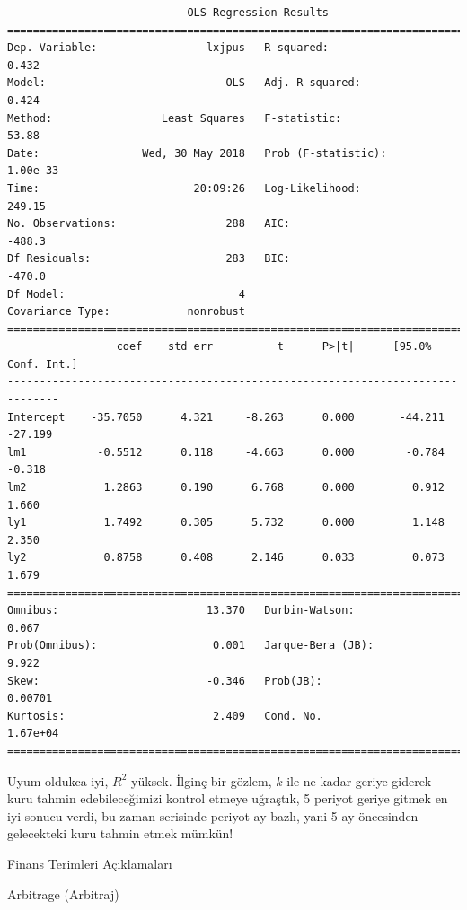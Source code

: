 \documentclass[12pt,fleqn]{article}\usepackage{../../common}
\begin{document}
\begin{verbatim}
                            OLS Regression Results                            
==============================================================================
Dep. Variable:                 lxjpus   R-squared:                       0.432
Model:                            OLS   Adj. R-squared:                  0.424
Method:                 Least Squares   F-statistic:                     53.88
Date:                Wed, 30 May 2018   Prob (F-statistic):           1.00e-33
Time:                        20:09:26   Log-Likelihood:                 249.15
No. Observations:                 288   AIC:                            -488.3
Df Residuals:                     283   BIC:                            -470.0
Df Model:                           4                                         
Covariance Type:            nonrobust                                         
==============================================================================
                 coef    std err          t      P>|t|      [95.0% Conf. Int.]
------------------------------------------------------------------------------
Intercept    -35.7050      4.321     -8.263      0.000       -44.211   -27.199
lm1           -0.5512      0.118     -4.663      0.000        -0.784    -0.318
lm2            1.2863      0.190      6.768      0.000         0.912     1.660
ly1            1.7492      0.305      5.732      0.000         1.148     2.350
ly2            0.8758      0.408      2.146      0.033         0.073     1.679
==============================================================================
Omnibus:                       13.370   Durbin-Watson:                   0.067
Prob(Omnibus):                  0.001   Jarque-Bera (JB):                9.922
Skew:                          -0.346   Prob(JB):                      0.00701
Kurtosis:                       2.409   Cond. No.                     1.67e+04
==============================================================================
\end{verbatim}

Uyum oldukca iyi, $R^2$ yüksek. İlginç bir gözlem, $k$ ile ne kadar geriye
giderek kuru tahmin edebileceğimizi kontrol etmeye uğraştık, 5 periyot geriye
gitmek en iyi sonucu verdi, bu zaman serisinde periyot ay bazlı, yani 5 ay
öncesinden gelecekteki kuru tahmin etmek mümkün!

\newpage

Finans Terimleri Açıklamaları

Arbitrage (Arbitraj)
\end{document}
